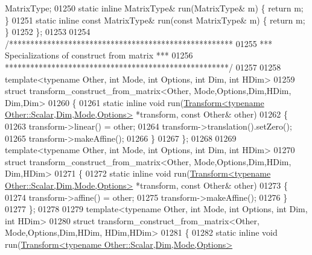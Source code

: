 \begin{DoxyCode}
       MatrixType;
01250   \textcolor{keyword}{static} \textcolor{keyword}{inline} MatrixType& run(MatrixType& m) \{ \textcolor{keywordflow}{return} m; \}
01251   \textcolor{keyword}{static} \textcolor{keyword}{inline} \textcolor{keyword}{const} MatrixType& run(\textcolor{keyword}{const} MatrixType& m) \{ \textcolor{keywordflow}{return} m; \}
01252 \};
01253 
01254 \textcolor{comment}{/*****************************************************}
01255 \textcolor{comment}{*** Specializations of construct from matrix       ***}
01256 \textcolor{comment}{*****************************************************/}
01257 
01258 \textcolor{keyword}{template}<\textcolor{keyword}{typename} Other, \textcolor{keywordtype}{int} Mode, \textcolor{keywordtype}{int} Options, \textcolor{keywordtype}{int} Dim, \textcolor{keywordtype}{int} HDim>
01259 \textcolor{keyword}{struct }transform\_construct\_from\_matrix<Other, Mode,Options,Dim,HDim, Dim,Dim>
01260 \{
01261   \textcolor{keyword}{static} \textcolor{keyword}{inline} \textcolor{keywordtype}{void} run(\hyperlink{group___geometry___module_class_eigen_1_1_transform}{Transform<typename Other::Scalar,Dim,Mode,Options>}
       *transform, \textcolor{keyword}{const} Other& other)
01262   \{
01263     transform->linear() = other;
01264     transform->translation().setZero();
01265     transform->makeAffine();
01266   \}
01267 \};
01268 
01269 \textcolor{keyword}{template}<\textcolor{keyword}{typename} Other, \textcolor{keywordtype}{int} Mode, \textcolor{keywordtype}{int} Options, \textcolor{keywordtype}{int} Dim, \textcolor{keywordtype}{int} HDim>
01270 \textcolor{keyword}{struct }transform\_construct\_from\_matrix<Other, Mode,Options,Dim,HDim, Dim,HDim>
01271 \{
01272   \textcolor{keyword}{static} \textcolor{keyword}{inline} \textcolor{keywordtype}{void} run(\hyperlink{group___geometry___module_class_eigen_1_1_transform}{Transform<typename Other::Scalar,Dim,Mode,Options>}
       *transform, \textcolor{keyword}{const} Other& other)
01273   \{
01274     transform->affine() = other;
01275     transform->makeAffine();
01276   \}
01277 \};
01278 
01279 \textcolor{keyword}{template}<\textcolor{keyword}{typename} Other, \textcolor{keywordtype}{int} Mode, \textcolor{keywordtype}{int} Options, \textcolor{keywordtype}{int} Dim, \textcolor{keywordtype}{int} HDim>
01280 \textcolor{keyword}{struct }transform\_construct\_from\_matrix<Other, Mode,Options,Dim,HDim, HDim,HDim>
01281 \{
01282   \textcolor{keyword}{static} \textcolor{keyword}{inline} \textcolor{keywordtype}{void} run(\hyperlink{group___geometry___module_class_eigen_1_1_transform}{Transform<typename Other::Scalar,Dim,Mode,Options>}

\end{DoxyCode}
